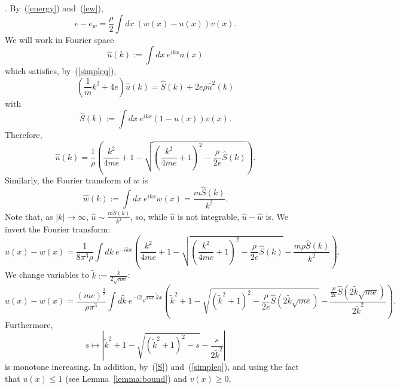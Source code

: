 \documentclass{ian}
\begin{document}
  .
  By\-~(\ref{energy}) and\-~(\ref{ew}),
  \begin{equation}
    e-e_w=\frac\rho2\int dx\ (w(x)-u(x))v(x)
    .
  \end{equation}
  We will work in Fourier space
  \begin{equation}
    \hat u(k):=\int dx\ e^{ikx}u(x)
    \label{fourieru}
  \end{equation}
  which satisfies, by\-~(\ref{simpleq}),
  \begin{equation}
  \left(\frac1mk^2+4e\right)\hat u(k)
  =\hat S(k)
  +2e\rho \hat u^2(k)
  \end{equation}
  with
  \begin{equation}
    \hat S(k):=\int dx\ e^{ikx}(1-u(x))v(x)
    .
    \label{S}
  \end{equation}
  Therefore,
  \begin{equation}
    \hat u(k)=\frac1\rho\left(\frac{k^2}{4me}+1-\sqrt{\left(\frac{k^2}{4me}+1\right)^2-\frac\rho{2e}\hat S(k)}\right)
    .
    \label{hatu}
  \end{equation}
  Similarly, the Fourier transform of $w$ is
  \begin{equation}
    \hat w(k):=\int dx\ e^{ikx}w(x)=\frac{m\hat S(k)}{k^2}
    .
    \label{u1hat}
  \end{equation}
  Note that, as $|k|\to\infty$, $\hat u\sim \frac{m\hat S(k)}{k^2}$, so, while $\hat u$ is not integrable, $\hat u-\hat w$ is.
  We invert the Fourier transform:
  \begin{equation}
    u(x)-w(x)=\frac1{8\pi^3\rho}\int dk\ e^{-ikx}
    \left(\frac{k^2}{4me}+1-\sqrt{\left(\frac{k^2}{4me}+1\right)^2-\frac\rho{2e}\hat S(k)}-\frac{m\rho\hat S(k)}{k^2}\right)
    .
  \end{equation}
  We change variables to $\tilde k:=\frac k{2\sqrt{me}}$:
  \begin{equation}
    u(x)-w(x)
    =
    \frac{(me)^{\frac32}}{\rho\pi^3}\int d\tilde k\ e^{-i2\sqrt{me}\tilde kx}
    \left(\tilde k^2+1-\sqrt{(\tilde k^2+1)^2-\frac\rho{2e}\hat S(2\tilde k\sqrt{me})}-\frac{\frac\rho{2e}\hat S(2\tilde k\sqrt{me})}{2\tilde k^2}\right)
    .
  \end{equation}
  Furthermore,
  \begin{equation}
    s\mapsto\left|\tilde k^2+1-\sqrt{(\tilde k^2+1)^2-s}-\frac{s}{2\tilde k^2}\right|
  \end{equation}
  is monotone increasing.
  In addition, by~\-(\ref{S}) and~\-(\ref{simpleq}), and using the fact that $u(x)\leqslant 1$ (see Lemma\-~\ref{lemma:bound}) and $v(x)\geqslant 0$,
\end{document}
